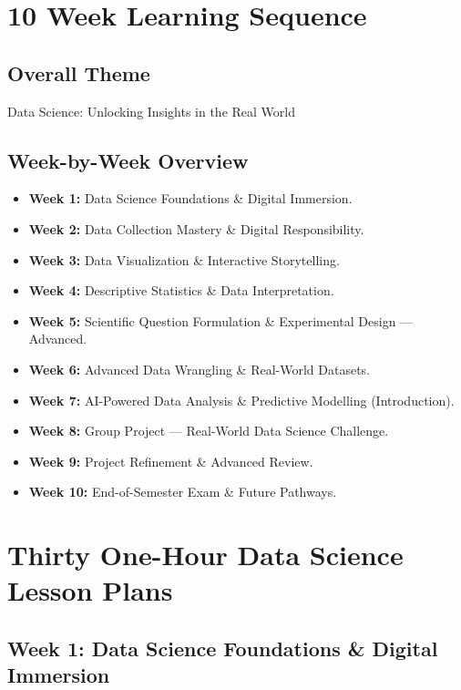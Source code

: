 \documentclass{tufte-book}
\begin{document}
\chapter{10 Week Learning Sequence}
\section*{Overall Theme}
Data Science: Unlocking Insights in the Real World

\section*{Week-by-Week Overview}
\begin{itemize}[leftmargin=*, label={\textbullet}]
    \item \textbf{Week 1:} Data Science Foundations \& Digital Immersion.
    \item \textbf{Week 2:} Data Collection Mastery \& Digital Responsibility.
    \item \textbf{Week 3:} Data Visualization \& Interactive Storytelling.
    \item \textbf{Week 4:} Descriptive Statistics \& Data Interpretation.
    \item \textbf{Week 5:} Scientific Question Formulation \& Experimental Design --- Advanced.
    \item \textbf{Week 6:} Advanced Data Wrangling \& Real-World Datasets.
    \item \textbf{Week 7:} AI-Powered Data Analysis \& Predictive Modelling (Introduction).
    \item \textbf{Week 8:} Group Project --- Real-World Data Science Challenge.
    \item \textbf{Week 9:} Project Refinement \& Advanced Review.
    \item \textbf{Week 10:} End-of-Semester Exam \& Future Pathways.
\end{itemize}

\chapter{Thirty One-Hour Data Science Lesson Plans}

\section{Week 1: Data Science Foundations \& Digital Immersion}
\end{document}
